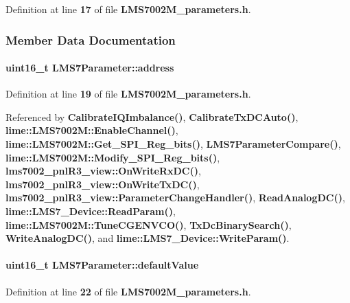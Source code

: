 Definition at line {\bf 17} of file {\bf L\+M\+S7002\+M\+\_\+parameters.\+h}.



\subsubsection{Member Data Documentation}
\paragraph[{address}]{\setlength{\rightskip}{0pt plus 5cm}uint16\+\_\+t L\+M\+S7\+Parameter\+::address}\label{structLMS7Parameter_aa39741a79dad2c271712f3a2352f713b}


Definition at line {\bf 19} of file {\bf L\+M\+S7002\+M\+\_\+parameters.\+h}.



Referenced by {\bf Calibrate\+I\+Q\+Imbalance()}, {\bf Calibrate\+Tx\+D\+C\+Auto()}, {\bf lime\+::\+L\+M\+S7002\+M\+::\+Enable\+Channel()}, {\bf lime\+::\+L\+M\+S7002\+M\+::\+Get\+\_\+\+S\+P\+I\+\_\+\+Reg\+\_\+bits()}, {\bf L\+M\+S7\+Parameter\+Compare()}, {\bf lime\+::\+L\+M\+S7002\+M\+::\+Modify\+\_\+\+S\+P\+I\+\_\+\+Reg\+\_\+bits()}, {\bf lms7002\+\_\+pnl\+R3\+\_\+view\+::\+On\+Write\+Rx\+D\+C()}, {\bf lms7002\+\_\+pnl\+R3\+\_\+view\+::\+On\+Write\+Tx\+D\+C()}, {\bf lms7002\+\_\+pnl\+R3\+\_\+view\+::\+Parameter\+Change\+Handler()}, {\bf Read\+Analog\+D\+C()}, {\bf lime\+::\+L\+M\+S7\+\_\+\+Device\+::\+Read\+Param()}, {\bf lime\+::\+L\+M\+S7002\+M\+::\+Tune\+C\+G\+E\+N\+V\+C\+O()}, {\bf Tx\+Dc\+Binary\+Search()}, {\bf Write\+Analog\+D\+C()}, and {\bf lime\+::\+L\+M\+S7\+\_\+\+Device\+::\+Write\+Param()}.

\paragraph[{default\+Value}]{\setlength{\rightskip}{0pt plus 5cm}uint16\+\_\+t L\+M\+S7\+Parameter\+::default\+Value}\label{structLMS7Parameter_a69068523a6bb582ea2b8610cfb8fa1dd}


Definition at line {\bf 22} of file {\bf L\+M\+S7002\+M\+\_\+parameters.\+h}.

